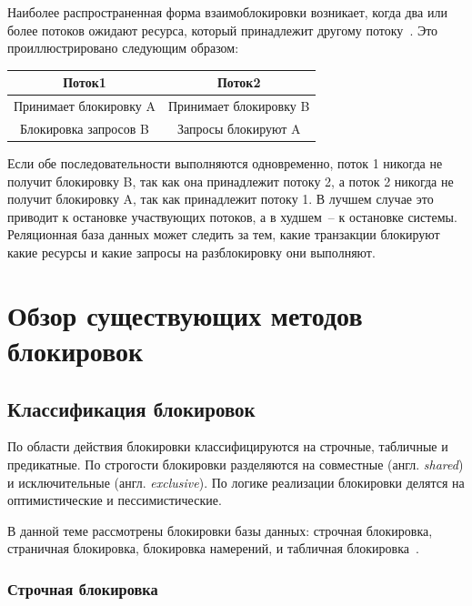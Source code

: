 Наиболее распространенная форма взаимоблокировки возникает, когда два или более потоков ожидают ресурса, который принадлежит другому потоку~\cite{deadlock_detection}. 
Это проиллюстрировано следующим образом:
\FloatBarrier
\begin{table}[h]
	\renewcommand{\arraystretch}{1.8}
	\renewcommand{\tabcolsep}{0.1cm} 
	\begin{center}
		\begin{tabular}{|c|c|} 
			\hline
			Поток1 & Поток2 \\
			\hline
			Принимает блокировку A & Принимает блокировку B \\
			\hline 
			Блокировка запросов B & Запросы блокируют A \\
			\hline
		\end{tabular}
	\end{center}
\end{table}
\FloatBarrier

Если обе последовательности выполняются одновременно, поток 1 никогда не получит блокировку B, так как она принадлежит потоку 2, а поток 2 никогда не получит блокировку A, так как принадлежит потоку 1. 
В лучшем случае это приводит к остановке участвующих потоков, а в худшем~-- к остановке системы.
Реляционная база данных может следить за тем, какие транзакции блокируют какие ресурсы и какие запросы на разблокировку они выполняют.

\clearpage

\chapter{Обзор существующих методов блокировок}

\section{Классификация блокировок}

По области действия блокировки классифицируются на строчные, табличные и предикатные.
По строгости блокировки разделяются на совместные (англ. \textit{shared}) и исключительные (англ. \textit{exclusive}).
По логике реализации блокировки делятся на оптимистические и пессимистические.

В данной теме рассмотрены блокировки базы данных: строчная блокировка, страничная блокировка, блокировка намерений, и табличная блокировка~\cite{data_block}.

\subsection{Строчная блокировка}

